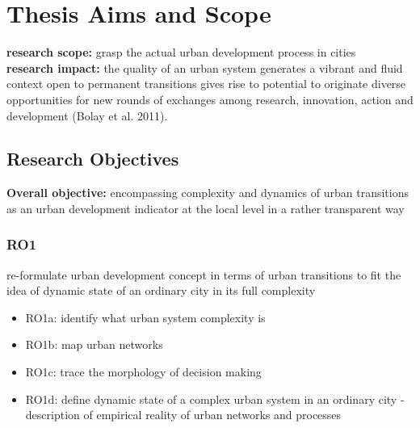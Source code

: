 \documentclass[11pt]{report}
\begin{document}
\section{Thesis Aims and Scope}
\textbf{research scope:} grasp the actual urban development process in cities
\\
\textbf{research impact:} the quality of an urban system generates a vibrant and fluid context open to permanent transitions gives rise to potential to originate diverse opportunities for new rounds of exchanges among research, innovation, action and development (Bolay et al. 2011).

\subsection{Research Objectives}
\textbf{Overall objective:} encompassing complexity and dynamics of urban transitions as an urban development indicator at the local level in a rather transparent way
\\

\subsubsection{RO1}
re-formulate urban development concept in terms of urban transitions to fit the idea of dynamic state of an ordinary city in its full complexity
\begin{itemize}
\item RO1a: identify what urban system complexity is  
\item RO1b: map  urban networks
\item RO1c: trace the morphology of decision making 
\item RO1d: define dynamic state of a complex urban system in an ordinary city - description of empirical reality of urban networks and processes
\end{itemize}
\end{document}
